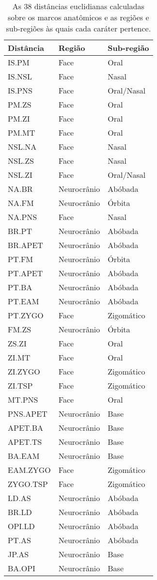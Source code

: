 \begin {table}[hp]
  \centering
  \caption {As 38 distâncias euclidianas calculadas sobre os marcos anatômicos e as regiões e sub-regiões às quais cada caráter pertence. \label{tab:dist}}
  
  \hr
  \begin {tabularx} {\textwidth} {X X X}
    \bf{Distância} & \bf{Região} & \bf{Sub-região}  \\
    \hline
    IS.PM & Face & Oral \\
    IS.NSL & Face & Nasal \\
    IS.PNS & Face & Oral/Nasal \\
    PM.ZS & Face & Oral \\
    PM.ZI & Face & Oral \\
    PM.MT & Face & Oral \\
    NSL.NA & Face & Nasal \\
    NSL.ZS & Face & Nasal \\
    NSL.ZI & Face & Oral/Nasal \\
    NA.BR & Neurocrânio & Abóbada \\
    NA.FM & Neurocrânio & Órbita \\
    NA.PNS & Face & Nasal \\
    BR.PT & Neurocrânio & Abóbada \\
    BR.APET & Neurocrânio & Abóbada \\
    PT.FM & Neurocrânio & Órbita \\
    PT.APET & Neurocrânio & Abóbada \\
    PT.BA & Neurocrânio & Abóbada \\
    PT.EAM & Neurocrânio & Abóbada \\
    PT.ZYGO & Face & Zigomático \\
    FM.ZS & Neurocrânio & Órbita \\
    ZS.ZI & Face & Oral \\
    ZI.MT & Face & Oral \\
    ZI.ZYGO & Face & Zigomático \\
    ZI.TSP & Face & Zigomático \\
    MT.PNS & Face & Oral \\
    PNS.APET & Neurocrânio & Base \\
    APET.BA & Neurocrânio & Base \\
    APET.TS & Neurocrânio & Base \\
    BA.EAM & Neurocrânio & Base \\
    EAM.ZYGO & Face & Zigomático \\
    ZYGO.TSP & Face & Zigomático \\
    LD.AS & Neurocrânio & Abóbada \\
    BR.LD & Neurocrânio & Abóbada \\
    OPI.LD & Neurocrânio & Abóbada \\
    PT.AS & Neurocrânio & Abóbada \\
    JP.AS & Neurocrânio & Base \\
    BA.OPI & Neurocrânio & Base \\
  \end {tabularx}
  \hr
\end {table} %